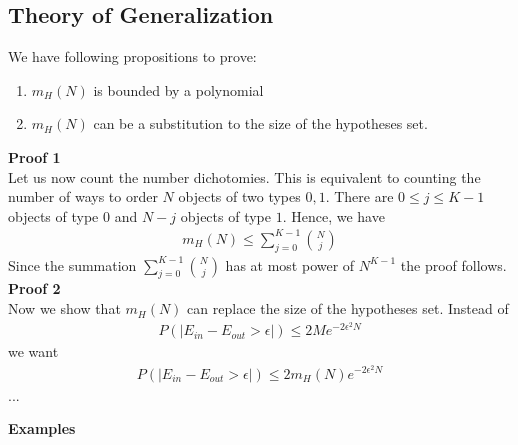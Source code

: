 \documentclass[../../main.tex]{subfiles}
\numberwithin{equation}{section}
\begin{document}
\subsection{Theory of Generalization}
We have following propositions to prove:
\begin{enumerate}
    \item $m_H(N)$ is bounded by a polynomial
    \item $m_H(N)$ can be a substitution to the size of the hypotheses set.
\end{enumerate}
\textbf{Proof 1}\\
Let us now count the number dichotomies. This is equivalent to counting the number of ways to order $N$ objects of two types $0, 1$. There are $0\leq j\leq K-1$ objects of type $0$ and $N-j$ objects of type $1$. Hence, we have 
\begin{align*}
    m_H(N)\leq \sum\limits_{j=0}^{K-1}{N\choose j}    
\end{align*}
Since the summation $\sum\limits_{j=0}^{K-1}{N\choose j}$ has at most power of $N^{K-1}$ the proof follows.
\textbf{Proof 2}\\

Now we show that $m_H(N)$ can replace the size of the hypotheses set. Instead of 
\begin{align*}
    P(|E_{in}-E_{out}>\epsilon|)\leq 2Me^{-2\epsilon^2N}
\end{align*}
we want 
\begin{align*}
    P(|E_{in}-E_{out}>\epsilon|)\leq 2m_H(N)e^{-2\epsilon^2N}
\end{align*}
...

\textbf{Examples}\\
\end{document}
